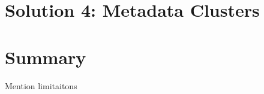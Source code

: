 \section{Solution 4:  Metadata Clusters}\label{s:sol4}

\section{Summary}\label{s:solutions-summary}
Mention limitaitons




